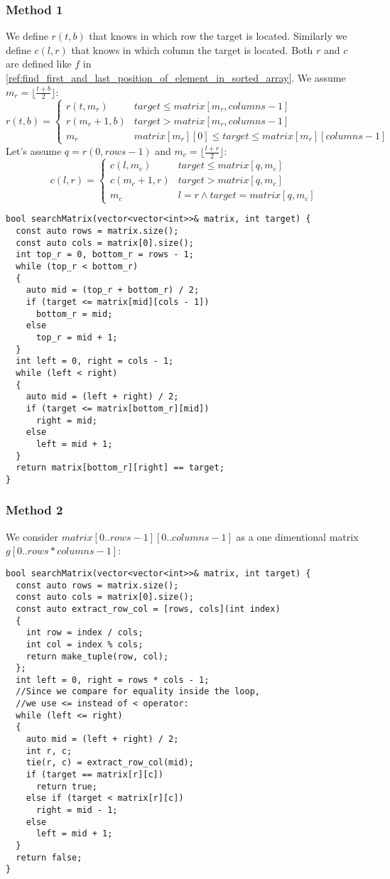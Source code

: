 \documentclass{book}
\begin{document}
	\subsubsection{Method 1}
	We define $r(t, b)$ that knows in which row the target is located. Similarly we define $c(l, r)$ that knows in which column the target is located. Both $r$ and $c$ are defined like $f$ in \ref{ref:find_first_and_last_position_of_element_in_sorted_array}. We assume $m_r = \lfloor \frac{t + b}{2} \rfloor$:
	\begin{equation*}
		r(t, b) = \begin{cases}
			r(t, m_r) & target \le matrix[m_r, columns - 1] \\
			r(m_r + 1, b) & target > matrix[m_r, columns - 1] \\
			m_r & matrix[m_r][0] \le target \le matrix[m_r][columns - 1]
		\end{cases}
	\end{equation*}
	Let's assume $q = r(0, rows - 1)$ and $m_c = \lfloor \frac{l + r}{2} \rfloor$:
	\begin{equation*}
		c(l, r) = \begin{cases}
			c(l, m_c) & target \le matrix[q, m_c] \\
			c(m_c + 1, r) & target > matrix[q, m_c] \\
			m_c & l = r \land target = matrix[q, m_c]
		\end{cases}
	\end{equation*}
	\begin{lstlisting}
bool searchMatrix(vector<vector<int>>& matrix, int target) {
  const auto rows = matrix.size();
  const auto cols = matrix[0].size();
  int top_r = 0, bottom_r = rows - 1;
  while (top_r < bottom_r)
  {
    auto mid = (top_r + bottom_r) / 2;
    if (target <= matrix[mid][cols - 1])
      bottom_r = mid;
    else
      top_r = mid + 1;
  }
  int left = 0, right = cols - 1;
  while (left < right)
  {
    auto mid = (left + right) / 2;
    if (target <= matrix[bottom_r][mid])
      right = mid;
    else
      left = mid + 1;
  }   
  return matrix[bottom_r][right] == target;
}
	\end{lstlisting}
	\subsubsection{Method 2}
	We consider $matrix[0..rows - 1][0..columns - 1]$ as a one dimentional matrix $g[0..rows * columns - 1]$:
	\begin{lstlisting}
bool searchMatrix(vector<vector<int>>& matrix, int target) {
  const auto rows = matrix.size();
  const auto cols = matrix[0].size();
  const auto extract_row_col = [rows, cols](int index)
  {
    int row = index / cols;
    int col = index % cols;
    return make_tuple(row, col);
  };
  int left = 0, right = rows * cols - 1;
  //Since we compare for equality inside the loop,
  //we use <= instead of < operator:
  while (left <= right)
  {
    auto mid = (left + right) / 2;
    int r, c;
    tie(r, c) = extract_row_col(mid);
    if (target == matrix[r][c])
      return true;
    else if (target < matrix[r][c])
      right = mid - 1;
    else
      left = mid + 1;
  }
  return false;
}
	\end{lstlisting}
\end{document}
